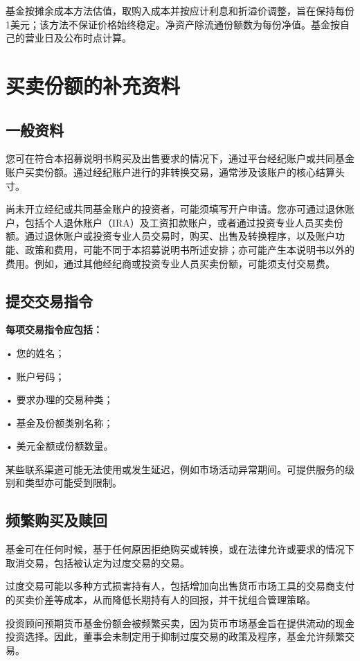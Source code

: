 \documentclass[UTF8,fontset=none,11pt,a4paper]{ctexart}
\begin{document}
基金按摊余成本方法估值，取购入成本并按应计利息和折溢价调整，旨在保持每份1美元；该方法不保证价格始终稳定。净资产除流通份额数为每份净值。基金按自己的营业日及公布\allowbreak\mbox{时点计算。}


\section*{买卖份额的补充资料}
\subsection*{一般资料}
您可在符合本招募说明书购买及出售要求的情况下，通过平台经纪账户或共同基金账户买卖份额。通过经纪账户进行的非转换交易，通常涉及该账户的核心\allowbreak\mbox{结算头寸。}


尚未开立经纪或共同基金账户的投资者，可能须填写开户申请。您亦可通过退休账户，包括个人退休账户（IRA）及工资扣款账户，或者通过投资专业人员买卖份额。通过退休账户或投资专业人员交易时，购买、出售及转换程序，以及账户功能、政策和费用，可能不同于本招募说明书所述安排；亦可能产生本说明书以外的费用。例如，通过其他经纪商或投资专业人员买卖份额，可能须支付\allowbreak\mbox{交易费。}


\subsection*{提交交易指令}
\textbf{每项交易指令应包括：}


• \allowbreak\mbox{您的姓名；}


• \allowbreak\mbox{账户号码；}


• 要求办理的\allowbreak\mbox{交易种类；}


• 基金及份额\allowbreak\mbox{类别名称；}


• 美元金额或\allowbreak\mbox{份额数量。}


某些联系渠道可能无法使用或发生延迟，例如市场活动异常期间。可提供服务的级别和类型亦可能\allowbreak\mbox{受到限制。}


\subsection*{频繁购买及赎回}
基金可在任何时候，基于任何原因拒绝购买或转换，或在法律允许或要求的情况下取消交易，包括被认定为过度交\allowbreak\mbox{易的交易。}


过度交易可能以多种方式损害持有人，包括增加向出售货币市场工具的交易商支付的买卖价差等成本，从而降低长期持有人的回报，并干扰组合\allowbreak\mbox{管理策略。}


投资顾问预期货币基金份额会被频繁买卖，因为货币市场基金旨在提供流动的现金投资选择。因此，董事会未制定用于抑制过度交易的政策及程序，基金允许\allowbreak\mbox{频繁交易。}
\end{document}
